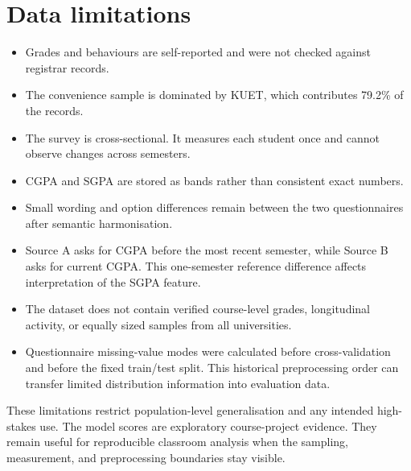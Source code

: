 \section{Data limitations}
\begin{itemize}
\item Grades and behaviours are self-reported and were not checked against registrar records.
\item The convenience sample is dominated by KUET, which contributes 79.2\% of the records.
\item The survey is cross-sectional. It measures each student once and cannot observe changes across semesters.
\item CGPA and SGPA are stored as bands rather than consistent exact numbers.
\item Small wording and option differences remain between the two questionnaires after semantic harmonisation.
\item Source A asks for CGPA before the most recent semester, while Source B asks for current CGPA. This one-semester reference difference affects interpretation of the SGPA feature.
\item The dataset does not contain verified course-level grades, longitudinal activity, or equally sized samples from all universities.
\item Questionnaire missing-value modes were calculated before cross-validation and before the fixed train/test split. This historical preprocessing order can transfer limited distribution information into evaluation data.
\end{itemize}
These limitations restrict population-level generalisation and any intended high-stakes use. The model scores are exploratory course-project evidence. They remain useful for reproducible classroom analysis when the sampling, measurement, and preprocessing boundaries stay visible.
